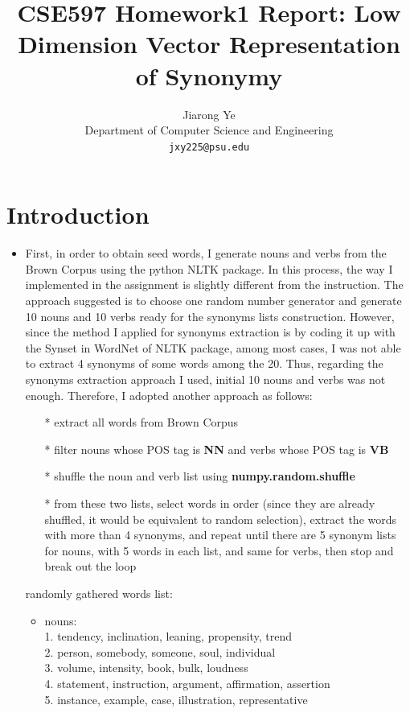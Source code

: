 \documentclass{article} %
\title{CSE597 Homework1 Report: Low Dimension Vector Representation of Synonymy}
\author{
Jiarong Ye\\
Department of Computer Science and Engineering\\
\texttt{jxy225@psu.edu} \\
}
\begin{document}
\maketitle

\section{Introduction}


\begin{itemize}
	\item First, in order to obtain seed words, I generate nouns and verbs from the Brown Corpus \cite{francis1979brown} using the python NLTK\cite{Bird:2006:NNL:1225403.1225421} package. In this process, the way I implemented in the assignment is slightly different from the instruction. The approach suggested is to choose one random number generator and generate 10 nouns and 10 verbs ready for the synonyms lists construction. However, since the method I applied for synonyms extraction is by coding it up with the Synset in WordNet of NLTK package, among most cases, I was not able to extract 4 synonyms of some words among the 20. Thus, regarding the synonyms extraction approach I used, initial 10 nouns and verbs was not enough. Therefore, I adopted another approach as follows:
	\begin{itemize}
		\item[*] extract all words from Brown Corpus
		\item[*] filter nouns whose POS tag is \textbf{NN} and verbs whose POS tag is \textbf{VB}
		\item[*] shuffle the noun and verb list using \textbf{numpy.random.shuffle}
		\item[*] from these two lists, select words in order (since they are already shuffled, it would be equivalent to random selection), extract the words with more than 4 synonyms, and repeat until there are 5 synonym lists for nouns, with 5 words in each list, and same for verbs, then stop and break out the loop
	\end{itemize}
	randomly gathered words list:
	\begin{itemize}
		\item nouns:\\
		1. tendency, inclination, leaning, propensity, trend\\
		2. person, somebody, someone, soul, individual\\
		3. volume, intensity, book, bulk, loudness\\
		4. statement, instruction, argument, affirmation, assertion\\
		5. instance, example, case, illustration, representative
		

\end{itemize}
\end{itemize}
\end{document}
